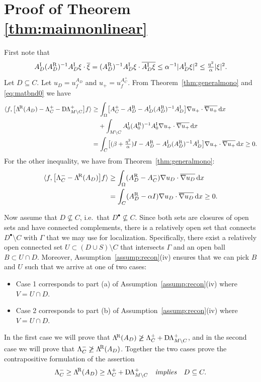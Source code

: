 \documentclass[reqno]{amsart}
\numberwithin{equation}{section}
\numberwithin{figure}{section}
\numberwithin{table}{section}
\theoremstyle{plain}
\theoremstyle{definition}
\theoremstyle{remark}
\newcommand{\abs}[1]{\lvert#1\rvert}
\newcommand{\inner}[1]{\langle#1\rangle}
\newcommand{\di}{\mathrm{d}}   %
\newcommand{\upR}{^{\textup{R}}}
\newcommand{\upI}{^{\textup{I}}}
\newcommand{\uptR}{^{\!\textup{R}}}
\newcommand{\LambdaR}{\Lambda\uptR}
\newcommand{\AR}{A\upR}
\newcommand{\AI}{A\upI}
\newcommand{\DLambda}{\textup{D}\mkern-1.5mu \Lambda}
\begin{document}
	\section{Proof of Theorem \ref{thm:mainnonlinear}} \label{sec:proofmainnonlinear}
	
	First note that
	\begin{equation} \label{eq:matbnd0}
		\AI_D(\AR_D)^{-1}\AI_D\xi\cdot\overline{\xi} = (\AR_D)^{-1}\AI_D\xi\cdot\overline{\AI_D\xi} \leq \alpha^{-1}\abs{\AI_D\xi}^2\leq \tfrac{\eta^2}{\alpha}\abs{\xi}^2.
	\end{equation}
	Let $D\subseteq C$. Let $u_D = u_f^{A_D}$ and $u_+ = u_f^{A_C^+}$. From Theorem~\ref{thm:generalmono} and \eqref{eq:matbnd0} we have
	\begin{align*}
		\inner{f,\bigl[ \LambdaR(A_D) - \Lambda_C^+ - \DLambda_{M\setminus C}^+ \bigr]f} &\geq \int_\Omega \bigl[ A_C^+ - \AR_D - \AI_D(\AR_D)^{-1}\AI_D \bigr] \nabla u_+\cdot\overline{\nabla u_+}\,\di x \\
		&\phantom{={}} + \int_{M\setminus C} \AI_0(\AR_0)^{-1}\AI_0\nabla u_+ \cdot\overline{\nabla u_+}\,\di x \\
		&= \int_C \bigl[ (\beta + \tfrac{\eta^2}{\alpha})I - \AR_D - \AI_D(\AR_D)^{-1}\AI_D \bigr]\nabla u_+ \cdot\overline{\nabla u_+}\,\di x \geq 0.
	\end{align*}
	For the other inequality, we have from Theorem~\ref{thm:generalmono}:
	\begin{align*}
		\inner{f,\bigl[ \Lambda_C^- - \LambdaR(A_D) \bigr]f} &\geq \int_\Omega (\AR_D - A_C^-)\nabla u_D\cdot\overline{\nabla u_D}\,\di x \\
		&= \int_C (\AR_D - \alpha I)\nabla u_D\cdot\overline{\nabla u_D}\,\di x \geq 0.
	\end{align*}
	
	Now assume that $D \not\subseteq C$, i.e.~that $D^\bullet\not\subseteq C$. Since both sets are closures of open sets and have connected complements, there is a relatively open set that connects $D^\bullet\setminus C$ with $\Gamma$ that we may use for localization. Specifically, there exist a relatively open connected set $U\subset (D\cup S)\setminus C$ that intersects $\Gamma$ and an open ball $B\subset U \cap D$. Moreover, Assumption~\ref{assump:recon}(iv) ensures that we can pick $B$ and $U$ such that we arrive at one of two cases:
	\begin{itemize}
		\item Case 1 corresponds to part (a) of Assumption~\ref{assump:recon}(iv) where $V = U\cap D$.
		\item Case 2 corresponds to part (b) of Assumption~\ref{assump:recon}(iv) where $V = U\cap D$.
	\end{itemize}
	In the first case we will prove that $\LambdaR(A_D) \not\geq \Lambda^+_{C} + \DLambda_{M\setminus C}^+$, and in the second case we will prove that $\Lambda^-_{C} \not\geq \LambdaR(A_D)$. Together the two cases prove the contrapositive formulation of the assertion 
	\begin{equation*}
		\Lambda^-_{C} \geq \LambdaR(A_D) \geq \Lambda^+_{C} + \DLambda_{M\setminus C}^+ \quad \text{\emph{implies}} \quad D \subseteq C.
	\end{equation*}
	
\end{document}
